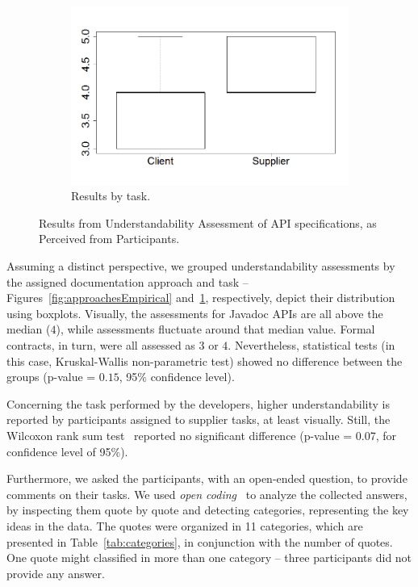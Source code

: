 \begin{figure}
\begin{subfigure}{.33\textwidth}
\includegraphics[width=1\linewidth]{figs/boxplotTasksEmpiricalStudy}
\caption{Results by task.}
\label{fig:tasksEmpirical}
\end{subfigure}
\caption{Results from Understandability Assessment of API specifications, as Perceived from Participants.}
\label{fig:empiricalResults}
\end{figure}

Assuming a distinct perspective, we grouped understandability assessments by the assigned documentation approach and task -- Figures~\ref{fig:approachesEmpirical} and~\ref{fig:tasksEmpirical}, respectively, depict their distribution using boxplots.
Visually, the assessments for Javadoc APIs are all above the median ($4$), while \contractjdoc{} assessments fluctuate around that median value. Formal contracts, in turn, were all assessed as $3$ or $4$.  
Nevertheless, statistical tests (in this case, Kruskal-Wallis non-parametric test) showed no difference between the groups (p-value = $0.15$, 95\% confidence level).

Concerning the task performed by the developers, higher understandability is reported by participants assigned to supplier tasks, at least visually. Still, the Wilcoxon rank sum test~\cite{statistical} reported no significant difference (p-value = 0.07, for confidence level of 95\%).

Furthermore, we asked the participants, with an open-ended question, to provide comments on their tasks. 
We used \emph{open coding}~\cite{Price2010} to analyze the collected answers, by inspecting them quote by quote and detecting categories, representing the key ideas in the data.
The quotes were organized in 11 categories, which are presented in Table~\ref{tab:categories}, in conjunction with the number of quotes. One quote might classified in more than one category -- three participants did not provide any answer.

